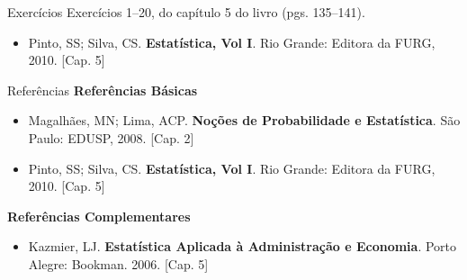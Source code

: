 \documentclass[10pt]{beamer}\usepackage[]{graphicx}\usepackage[]{color}
\theoremstyle{definition}
\begin{document}
\begin{frame}[fragile]{Exercícios}
  Exercícios 1--20, do capítulo 5 do livro (pgs. 135--141).
  \vspace{1em}
  \begin{itemize}
  \item[] Pinto, SS; Silva, CS. \textbf{Estatística, Vol I}. Rio Grande:
    Editora da FURG, 2010. [Cap. 5]
  \end{itemize}
\end{frame}

\begin{frame}{Referências}
  \textbf{Referências Básicas}
  \begin{itemize}
  \item Magalhães, MN; Lima, ACP. \textbf{Noções de Probabilidade e
      Estatística}. São Paulo: EDUSP, 2008. [Cap. 2]
  \item Pinto, SS; Silva, CS. \textbf{Estatística, Vol I}. Rio Grande:
    Editora da FURG, 2010. [Cap. 5]
  \end{itemize}
  \textbf{Referências Complementares}
  \begin{itemize}
  \item Kazmier, LJ. \textbf{Estatística Aplicada à Administração e
      Economia}. Porto Alegre: Bookman. 2006. [Cap. 5]
  \end{itemize}
\end{frame}
\end{document}
